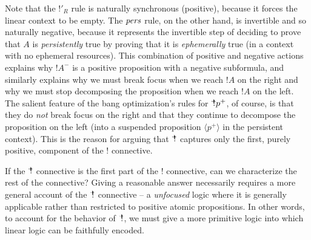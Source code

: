 Note that the ${!}'_R$ rule is naturally synchronous (positive),
because it forces the linear context to be empty. The ${\it pers}$
rule, on the other hand, is invertible and so naturally negative,
because it represents the invertible step of deciding to prove that
$A$ is {\it persistently} true by proving that it is {\it ephemerally}
true (in a context with no ephemeral resources). This combination of
positive and negative actions explains why ${!}A^-$ is a positive
proposition with a negative subformula, and similarly explains why we
must break focus when we reach ${!}A$ on the right and why we must
stop decomposing the proposition when we reach ${!}A$ on the left.
The salient feature of the bang optimization's rules for ${\mbox{\hspace{2pt}$\mathbb !$\hspace{-5pt}$^+$\hspace{-1pt}}}p^+$, of
course, is that they do {\it not} break focus on the right and that
they continue to decompose the proposition on the left (into a
suspended proposition $\langle p^+ \rangle$ in the persistent
context). This is the reason for arguing that ${\mbox{\hspace{2pt}$\mathbb !$\hspace{-5pt}$^+$\hspace{-1pt}}}$ captures only
the first, purely positive, component of the ${!}$ connective.

If the $\mbox{\hspace{2pt}$\mathbb !$\hspace{-5pt}$^+$\hspace{-1pt}}$ connective is the first part of the $!$ connective,
can we characterize the rest of the connective? Giving a reasonable
answer necessarily requires a more general account of the $\mbox{\hspace{2pt}$\mathbb !$\hspace{-5pt}$^+$\hspace{-1pt}}$
connective -- a {\it unfocused} logic where it is generally applicable
rather than restricted to positive atomic propositions. In other
words, to account for the behavior of $\mbox{\hspace{2pt}$\mathbb !$\hspace{-5pt}$^+$\hspace{-1pt}}$, we must give a more
primitive logic into which linear logic can be faithfully encoded.



